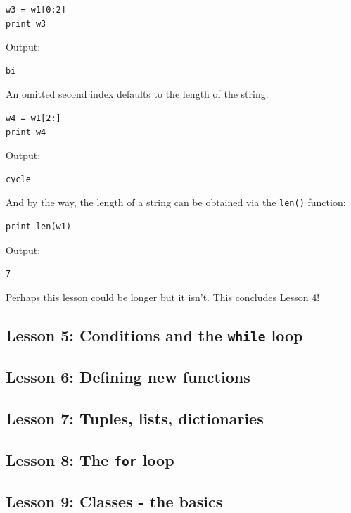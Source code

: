 \documentclass[article,A4,12pt]{llncs}
\begin{document}
\begin{verbatim}
w3 = w1[0:2]
print w3
\end{verbatim}
Output:

\begin{verbatim}
bi
\end{verbatim}
An omitted second index defaults to the length of the string:

\begin{verbatim}
w4 = w1[2:]
print w4
\end{verbatim}
Output:

\begin{verbatim}
cycle
\end{verbatim}
And by the way, the length of a string can be obtained via the {\tt len()} function:

\begin{verbatim}
print len(w1)
\end{verbatim}
Output:

\begin{verbatim}
7
\end{verbatim}
Perhaps this lesson could be longer but it isn't. This concludes Lesson 4!


\subsection{Lesson 5: Conditions and the {\tt while} loop}




\subsection{Lesson 6: Defining new functions}






\subsection{Lesson 7: Tuples, lists, dictionaries}







\subsection{Lesson 8: The {\tt for} loop}



\subsection{Lesson 9: Classes - the basics}
\end{document}
